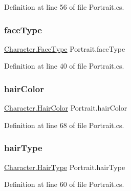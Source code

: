 Definition at line 56 of file Portrait.\+cs.

\mbox{\label{class_portrait_adee621ae3df1fbf3ed96e9262d9e3699}} 
\subsubsection{\texorpdfstring{faceType}{faceType}}
{\footnotesize\ttfamily \mbox{\hyperlink{class_character_aae9a74ea017a528536789f545094d628}{Character.\+Face\+Type}} Portrait.\+face\+Type\hspace{0.3cm}{\ttfamily [get]}}



Definition at line 40 of file Portrait.\+cs.

\mbox{\label{class_portrait_a656bde64b3ef49fa317d114d1c3fbe7c}} 
\subsubsection{\texorpdfstring{hairColor}{hairColor}}
{\footnotesize\ttfamily \mbox{\hyperlink{class_character_a7940fffce9bfadb9e7abf15490cf8bb0}{Character.\+Hair\+Color}} Portrait.\+hair\+Color\hspace{0.3cm}{\ttfamily [get]}}



Definition at line 68 of file Portrait.\+cs.

\mbox{\label{class_portrait_a7fbaf07b4f6d0fe0213e4b812fe90acc}} 
\subsubsection{\texorpdfstring{hairType}{hairType}}
{\footnotesize\ttfamily \mbox{\hyperlink{class_character_ada39ccb0e0be37a8f8f0e9a864eb5733}{Character.\+Hair\+Type}} Portrait.\+hair\+Type\hspace{0.3cm}{\ttfamily [get]}}



Definition at line 60 of file Portrait.\+cs.

\mbox{\label{class_portrait_a9ce977a3c3a8b9790abfaeb57dd16d78}} 
